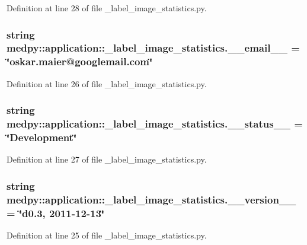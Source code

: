 Definition at line 28 of file \_\-label\_\-image\_\-statistics.py.

\hypertarget{namespacemedpy_1_1application_1_1__label__image__statistics_a5ef93e745da4efbfc1c49b0b55a42678}{
\subsubsection[{\_\-\_\-email\_\-\_\-}]{\setlength{\rightskip}{0pt plus 5cm}string {\bf medpy::application::\_\-label\_\-image\_\-statistics.\_\-\_\-email\_\-\_\-} = \char`\"{}oskar.maier@googlemail.com\char`\"{}}}
\label{namespacemedpy_1_1application_1_1__label__image__statistics_a5ef93e745da4efbfc1c49b0b55a42678}


Definition at line 26 of file \_\-label\_\-image\_\-statistics.py.

\hypertarget{namespacemedpy_1_1application_1_1__label__image__statistics_abd26d3f7d9aa64642a0406775b63da08}{
\subsubsection[{\_\-\_\-status\_\-\_\-}]{\setlength{\rightskip}{0pt plus 5cm}string {\bf medpy::application::\_\-label\_\-image\_\-statistics.\_\-\_\-status\_\-\_\-} = \char`\"{}Development\char`\"{}}}
\label{namespacemedpy_1_1application_1_1__label__image__statistics_abd26d3f7d9aa64642a0406775b63da08}


Definition at line 27 of file \_\-label\_\-image\_\-statistics.py.

\hypertarget{namespacemedpy_1_1application_1_1__label__image__statistics_aedb6621ea1308c7336d894e5be91a77a}{
\subsubsection[{\_\-\_\-version\_\-\_\-}]{\setlength{\rightskip}{0pt plus 5cm}string {\bf medpy::application::\_\-label\_\-image\_\-statistics.\_\-\_\-version\_\-\_\-} = \char`\"{}d0.3, 2011-\/12-\/13\char`\"{}}}
\label{namespacemedpy_1_1application_1_1__label__image__statistics_aedb6621ea1308c7336d894e5be91a77a}


Definition at line 25 of file \_\-label\_\-image\_\-statistics.py.

